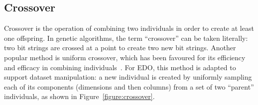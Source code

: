 \subsection{Crossover}

Crossover is the operation of combining two individuals in order to create at
least one offspring. In genetic algorithms, the term ``crossover'' can be taken
literally: two bit strings are crossed at a point to create two new bit strings.
Another popular method is uniform crossover, which has been favoured for its
efficiency and efficacy in combining individuals~\cite{Semenkin2012}. For EDO,
this method is adapted to support dataset manipulation: a new individual is
created by uniformly sampling each of its components (dimensions and then
columns) from a set of two ``parent'' individuals, as shown in
Figure~\ref{figure:crossover}.



